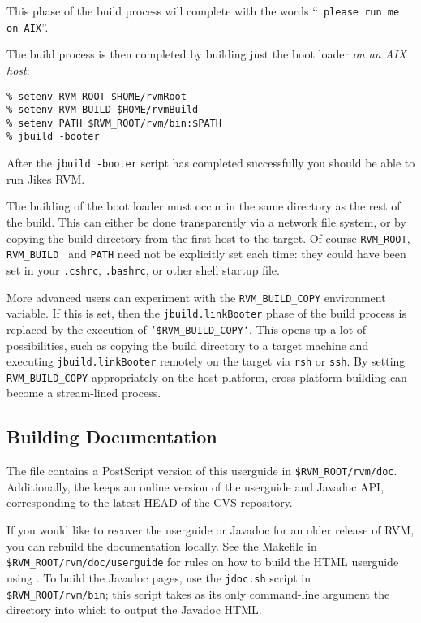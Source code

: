 This phase of the build process will complete with the words ``{\tt
  please run me on AIX}''.


The build process is then completed by building just the boot loader {\em
  on an AIX host}:

\begin{verbatim}
% setenv RVM_ROOT $HOME/rvmRoot
% setenv RVM_BUILD $HOME/rvmBuild
% setenv PATH $RVM_ROOT/rvm/bin:$PATH
% jbuild -booter
\end{verbatim}

After the \texttt{jbuild -booter} script has completed successfully you should be able 
to run Jikes RVM. 

The building of the boot loader must occur in the same directory as
the rest of the build.  This can either be done transparently via a
network file system, or by copying the build directory from the first
host to the target.  Of course \texttt{RVM\_ROOT}, \texttt{RVM\_BUILD }
and \texttt{PATH} need not be explicitly set each time: they could have
been set in your \texttt{.cshrc}, \texttt{.bashrc}, or other shell startup file.

More advanced users can experiment with the \texttt{RVM\_BUILD\_COPY}
environment variable.  If this is set, then the 
\texttt{jbuild.linkBooter} phase of the build process is replaced by the
execution of \texttt{`\$RVM\_BUILD\_COPY`}.  This opens up a lot of
possibilities, such as copying the build directory to a target
machine and executing \texttt{jbuild.linkBooter} remotely on the target
via \texttt{rsh} or \texttt{ssh}.  By setting \texttt{RVM\_BUILD\_COPY}
appropriately on the host platform, cross-platform building can become
a stream-lined process.

\subsection{Building Documentation}

The \texttt{\RVMTarFile} file contains a PostScript version of this userguide
in \texttt{\$RVM\_ROOT/rvm/doc}.  Additionally, the 
 keeps an online version of
the userguide and Javadoc API, corresponding to the latest HEAD of the CVS
repository.

If you would like to recover the userguide or Javadoc for an older release
of RVM, you can rebuild the documentation locally.  See the Makefile in
\texttt{\$RVM\_ROOT/rvm/doc/userguide} for rules on how to build the
HTML userguide using
.  To build the Javadoc pages, use
the \texttt{jdoc.sh} script in \texttt{\$RVM\_ROOT/rvm/bin}; this
script takes as its only command-line argument the directory into
which to output the Javadoc HTML. 
